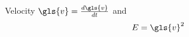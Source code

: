 \documentclass{article}
\begin{document}
Velocity $\gls{v} = \frac{d\gls{v}}{dt}$ and
\begin{equation} E = \gls{v}^2 \end{equation}
\printglossaries
\end{document}
